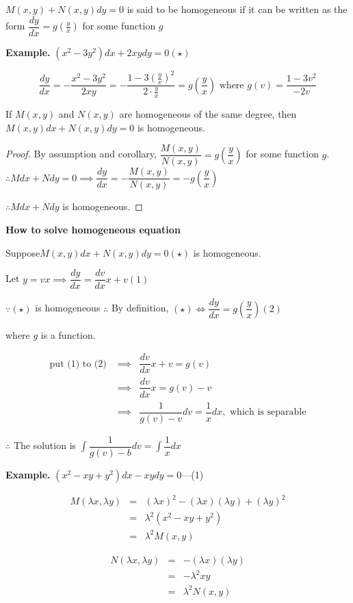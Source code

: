 \begin{defn}
	$M(x,y) + N(x,y)dy = 0$ is said to be homogeneous if it can be written as the form $\dfrac{dy}{dx} = g(\frac{y}{x})$ for some function $g$
\end{defn}

\textbf{Example.} $(x^2 - 3y^2)dx + 2xydy = 0 (\star)$

$$\dfrac{dy}{dx} = -\dfrac{x^2 - 3y^2}{2xy} = - \dfrac{1 - 3(\frac{y}{x})^2}{2 \cdot \frac{y}{x}} = g(\dfrac{y}{x}) \text{ where } g(v) = \dfrac{1 - 3v^2}{-2v}$$

\begin{rmk*}
	If $M(x,y)$ and $N(x,y)$ are homogeneous of the same degree, then $M(x,y)dx + N(x,y)dy = 0$ is homogeneous.
\end{rmk*}

\begin{proof}
	By assumption and corollary, $\dfrac{M(x,y)}{N(x,y)} = g(\dfrac{y}{x})$ for some function $g$. $\therefore Mdx + Ndy = 0 \implies \dfrac{dy}{dx} = -\dfrac{M(x,y)}{N(x,y)} = -g(\dfrac{y}{x})$
	
	$\therefore Mdx + Ndy$ is homogeneous.
\end{proof}

\textbf{How to solve homogeneous equation}

Suppose$M(x,y)dx + N(x,y)dy = 0 (\star)$ is homogeneous.

Let $y = vx \implies \dfrac{dy}{dx} = \dfrac{dv}{dx}x + v (1)$

$\because (\star)$ is homogeneous $\therefore$ By definition, $(\star) \Leftrightarrow \dfrac{dy}{dx} = g(\dfrac{y}{x})(2)$

where $g$ is a function.

\begin{eqnarray*}
	\text{put (1) to (2) } &\implies& \dfrac{dv}{dx}x + v = g(v)\\
	&\implies& \dfrac{dv}{dx}x = g(v) - v\\
	&\implies& \dfrac{1}{g(v) - v}dv = \dfrac{1}{x}dx, \text{ which is separable}
\end{eqnarray*}

$\therefore$ The solution is $\int\dfrac{1}{g(v) - b}dv = \int \dfrac{1}{x}dx$

\textbf{Example.} $(x^2 - xy + y^2)dx - xydy = 0$---(1)

\begin{solution}
	\begin{eqnarray*}
		M(\lambda x, \lambda y) &=& (\lambda x)^2 - (\lambda x)(\lambda y) + (\lambda y)^2\\
		&=& \lambda^2(x^2 - xy + y^2)\\
		&=& \lambda^2 M(x,y)
	\end{eqnarray*}
	
	\begin{eqnarray*}
		N(\lambda x,\lambda y) &=& -(\lambda x)(\lambda y)\\
		&=& - \lambda^2 xy\\
		&=& \lambda^2 N(x,y) 
	\end{eqnarray*}
\end{solution}

